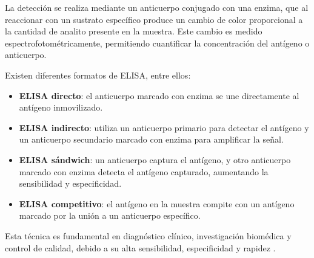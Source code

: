 La detección se realiza mediante un anticuerpo conjugado con una enzima, que al reaccionar con un sustrato específico produce un cambio de color proporcional a la cantidad de analito presente en la muestra. Este cambio es medido espectrofotométricamente, permitiendo cuantificar la concentración del antígeno o anticuerpo.

Existen diferentes formatos de ELISA, entre ellos:

\begin{itemize}
    \item \textbf{ELISA directo}: el anticuerpo marcado con enzima se une directamente al antígeno inmovilizado.
    \item \textbf{ELISA indirecto}: utiliza un anticuerpo primario para detectar el antígeno y un anticuerpo secundario marcado con enzima para amplificar la señal.
    \item \textbf{ELISA sándwich}: un anticuerpo captura el antígeno, y otro anticuerpo marcado con enzima detecta el antígeno capturado, aumentando la sensibilidad y especificidad.
    \item \textbf{ELISA competitivo}: el antígeno en la muestra compite con un antígeno marcado por la unión a un anticuerpo específico.
\end{itemize}

Esta técnica es fundamental en diagnóstico clínico, investigación biomédica y control de calidad, debido a su alta sensibilidad, especificidad y rapidez \cite{Lequin2005, Crowther2009}.

